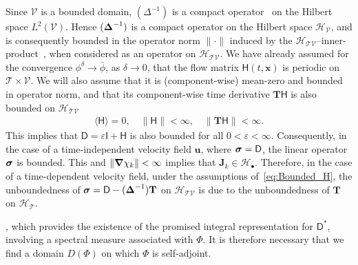 \documentclass[leqno,onefignum,onetabnum]{siamltex1213}
\newcommand{\Tb}{\mathbf{T}}
\newcommand{\Tc}{\mathcal{T}}
\newcommand{\Vc}{\mathcal{V}}
\newcommand{\Hc}{\mathcal{H}}
\newcommand{\Dm}{\mathsf{D}}
\newcommand{\Hm}{\mathsf{H}}
\newcommand{\Ib}{\mathsf{I}}
\newcommand\bsig{\mbox{\boldmath${\sigma}$}}
\newcommand\bDelta{\mbox{\boldmath${\Delta}$}}
\newcommand\bnabla{\mbox{\boldmath${\nabla}$}}
\newcommand{\vecJ}{\boldsymbol{J}}
\newcommand{\vecx}{\boldsymbol{x}}
\newcommand{\vecu}{\boldsymbol{u}}
\begin{document}
Since $\Vc$ is a bounded domain, $(\Delta^{-1})$ is a compact
operator~\cite{Stakgold:BVP:2000} on the Hilbert space
$L^2(\Vc)$. Hence 
$(\bDelta^{-1})$ is a compact operator on the Hilbert space
$\Hc_{\Vc}$, and is consequently bounded in the operator norm $\|\cdot\|$
induced by the
$\Hc_{\Tc\Vc}$--inner-product~\cite{Reed-1980,Stone:64,Stakgold:BVP:2000},
when considered as an  
operator on $\Hc_{\Tc\Vc}$.  We have already assumed 
for the convergence $\phi^\delta\to\bar{\phi}$, as $\delta\to0$, that the flow matrix
$\Hm(t,\vecx)$ is periodic on $\Tc\times\Vc$. We will also assume that it
is (component-wise) mean-zero and bounded in operator norm, and that
its component-wise time derivative $\Tb\Hm$ is also bounded on
$\Hc_{\Tc\Vc}$ 
%
\begin{align}%
  \langle\Hm\rangle=0, \quad \|\Hm\|<\infty, \quad \|\Tb\Hm\|<\infty.
\end{align}
%
This implies that $\Dm=\varepsilon\Ib+\Hm$ is also bounded for all
$0<\varepsilon<\infty$. Consequently, in the case of a time-independent velocity 
field $\vecu $, where $\bsig=\Dm$, the linear operator $\bsig$ is
bounded. This and $\|\bnabla \chi_k\|<\infty$ implies that 
$\vecJ_k\in\Hc_\bullet$. Therefore, in the case of a time-dependent velocity
field, under the assumptions of~\eqref{eq:Bounded_H}, the
unboundedness of $\bsig=\Dm-(\bDelta^{-1})\Tb$ on $\Hc_{\Tc\Vc}$
is due to the unboundedness of $\Tb$ on $\Hc_{\Tc}$.   






, which provides the existence of the promised   
integral representation for $\Dm^*$, involving a spectral measure
associated with $\Phi$. It is therefore necessary that we find a
domain $D(\Phi)$ on which $\Phi$ is self-adjoint.
\end{document}
